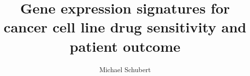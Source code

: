 \documentclass[a4paper, headinclude, footinclude, hidelinks, BCOR=1cm]{scrbook}
\title{Gene expression signatures for cancer cell line drug sensitivity and patient outcome}
\author{Michael Schubert}
\begin{document}

\maketitle

\begingroup
    \tableofcontents
    \cleardoublepage
\endgroup

%













\backmatter

\printbibliography[heading=bibintoc]

\renewcommand{\thesection}{\Alph{section}}

\begin{appendices}



\end{appendices}
\end{document}
